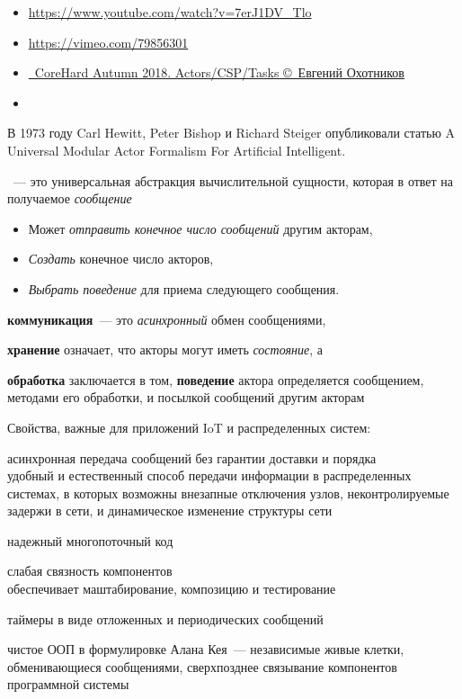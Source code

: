 \label{akka}\secdown

\begin{itemize}[nosep]
\item \url{https://www.youtube.com/watch?v=7erJ1DV_Tlo}
\item \url{https://vimeo.com/79856301}
\item \href{https://www.youtube.com/watch?v=Gihdujm6EWU}{\cpp\ CoreHard Autumn 2018. Actors/CSP/Tasks \copyright\ Евгений Охотников}
\item \cite{agha}
\end{itemize}

\clearpage
В 1973 году Carl Hewitt, Peter Bishop и Richard Steiger опубликовали статью 
A Universal Modular Actor Formalism For Artificial Intelligent.

\ --- это универсальная абстракция вычислительной сущности, которая в ответ на получаемое \emph{сообщение}
\begin{itemize}
\item Может \emph{отправить конечное число сообщений} другим акторам,
\item \emph{Создать} конечное число акторов,
\item \emph{Выбрать поведение} для приема следующего сообщения.
\end{itemize}

\begin{description}
\item{\textbf{коммуникация}}\ --- это \emph{асинхронный} обмен сообщениями, 
\item{\textbf{хранение}} означает, что акторы могут иметь \emph{состояние}, а 
\item{\textbf{обработка}} заключается в том, \textbf{поведение} актора определяется сообщением, 
методами его обработки, и посылкой сообщений другим акторам
\end{description}

Свойства, важные для приложений IoT и распределенных систем:
\begin{description}%
    \item{асинхронная передача сообщений} без гарантии доставки и порядка\\
    удобный и естественный способ передачи информации в распределенных системах, в которых 
    возможны внезапные отключения узлов, неконтролируемые задержи в сети, и динамическое
    изменение структуры сети
    \item{надежный многопоточный код}
    \item{слабая связность компонентов}\\ обеспечивает маштабирование, композицию и тестирование
    \item{таймеры в виде отложенных и периодических сообщений}
    \item{чистое ООП} в формулировке Алана Кея\ --- независимые живые клетки, обменивающиеся сообщениями,
    сверхпозднее связывание компонентов программной системы
\end{description}



\secup
